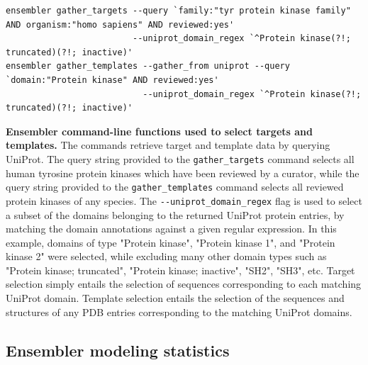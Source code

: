 \documentclass[aps,prl,preprint,nofootinbib,superscriptaddress,linenumbers]{revtex4-1}
\begin{document}
\begin{codebox*}[tbp]
\scriptsize
\begin{Verbatim}[frame=single]
ensembler gather_targets --query `family:"tyr protein kinase family" AND organism:"homo sapiens" AND reviewed:yes'
                         --uniprot_domain_regex `^Protein kinase(?!; truncated)(?!; inactive)'
ensembler gather_templates --gather_from uniprot --query `domain:"Protein kinase" AND reviewed:yes'
                           --uniprot_domain_regex `^Protein kinase(?!; truncated)(?!; inactive)'
\end{Verbatim}
\caption{\footnotesize {\bf Ensembler command-line functions used to select targets and templates.}
The commands retrieve target and template data by querying UniProt.
The query string provided to the {\tt gather\_targets} command selects all human tyrosine protein kinases which have been reviewed by a curator, while the query string provided to the {\tt gather\_templates} command selects all reviewed protein kinases of any species.
The {\tt-{}-uniprot\_domain\_regex} flag is used to select a subset of the domains belonging to the returned UniProt protein entries, by matching the domain annotations against a given regular expression.
In this example, domains of type "Protein kinase", "Protein kinase 1", and "Protein kinase 2" were selected, while excluding many other domain types such as "Protein kinase; truncated", "Protein kinase; inactive", "SH2", "SH3", etc.
Target selection simply entails the selection of sequences corresponding to each matching UniProt domain.
Template selection entails the selection of the sequences and structures of any PDB entries corresponding to the matching UniProt domains.
}
\label{box:tk-gather-targets-templates}
\end{codebox*}

\subsection*{Ensembler modeling statistics}
\end{document}
